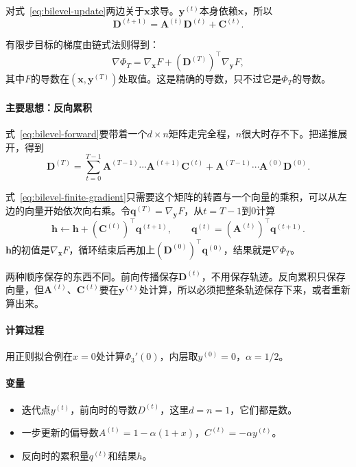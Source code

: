 对式~\eqref{eq:bilevel-update}两边关于$\bm{x}$求导。$\bm{y}^{(t)}$本身依赖$\bm{x}$，所以
\begin{equation}
 \bm{D}^{(t+1)}=\bm{A}^{(t)}\bm{D}^{(t)}+\bm{C}^{(t)}.
 \label{eq:bilevel-forward}
\end{equation}

有限步目标的梯度由链式法则得到：
\begin{equation}
 \nabla\Phi_T=\nabla_{\bm{x}}F+(\bm{D}^{(T)})^{\top}\nabla_{\bm{y}}F,
 \label{eq:bilevel-finite-gradient}
\end{equation}
其中$F$的导数在$(\bm{x},\bm{y}^{(T)})$处取值。这是精确的导数，只不过它是$\Phi_T$的导数。

\paragraph{主要思想：反向累积}
式~\eqref{eq:bilevel-forward}要带着一个$d\times n$矩阵走完全程，$n$很大时存不下。把递推展开，得到
\[
 \bm{D}^{(T)}=\sum_{t=0}^{T-1}\bm{A}^{(T-1)}\cdots\bm{A}^{(t+1)}\bm{C}^{(t)}+\bm{A}^{(T-1)}\cdots\bm{A}^{(0)}\bm{D}^{(0)}.
\]

式~\eqref{eq:bilevel-finite-gradient}只需要这个矩阵的转置与一个向量的乘积，可以从左边的向量开始依次向右乘。令$\bm{q}^{(T)}=\nabla_{\bm{y}}F$，从$t=T-1$到$0$计算
\begin{equation}
 \bm{h}\leftarrow\bm{h}+(\bm{C}^{(t)})^{\top}\bm{q}^{(t+1)},\qquad
 \bm{q}^{(t)}=(\bm{A}^{(t)})^{\top}\bm{q}^{(t+1)}.
 \label{eq:bilevel-reverse}
\end{equation}
$\bm{h}$的初值是$\nabla_{\bm{x}}F$，循环结束后再加上$(\bm{D}^{(0)})^{\top}\bm{q}^{(0)}$，结果就是$\nabla\Phi_T$。

两种顺序保存的东西不同。前向传播保存$\bm{D}^{(t)}$，不用保存轨迹。反向累积只保存向量，但$\bm{A}^{(t)}$、$\bm{C}^{(t)}$要在$\bm{y}^{(t)}$处计算，所以必须把整条轨迹保存下来，或者重新算出来。

\paragraph{计算过程}
用正则拟合例在$x=0$处计算$\Phi_3'(0)$，内层取$y^{(0)}=0$，$\alpha=1/2$。

\paragraph{变量}
\begin{itemize}
 \item 迭代点$y^{(t)}$，前向时的导数$D^{(t)}$，这里$d=n=1$，它们都是数。
 \item 一步更新的偏导数$A^{(t)}=1-\alpha(1+x)$，$C^{(t)}=-\alpha y^{(t)}$。
 \item 反向时的累积量$q^{(t)}$和结果$h$。
\end{itemize}

